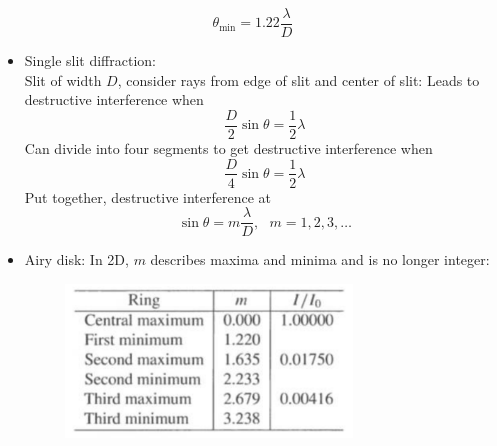 \documentclass[12pt]{article}
\begin{document}
\begin{itemize}
\begin{equation}
\theta_\text{min} = 1.22\frac{\lambda}{D}
\end{equation}
\begin{itemize}
\item Single slit diffraction:\\
Slit of width $D$, consider rays from edge of slit and center of slit: Leads to destructive interference when
\begin{equation}
\frac{D}{2}\sin\theta = \frac{1}{2}\lambda
\end{equation}
Can divide into four segments to get destructive interference when
\begin{equation}
\frac{D}{4}\sin\theta = \frac{1}{2}\lambda
\end{equation}
Put together, destructive interference at
\begin{equation}
\sin\theta = m\frac{\lambda}{D},~~~m=1,2,3,\dots
\end{equation}
\item Airy disk: In 2D, $m$ describes maxima and minima and is no longer integer:
\begin{figure}[h!]
\centering
\includegraphics[width=3in]{CandOfigs/airyrings.png}
\end{figure}
\end{itemize}


\end{itemize}
\end{document}
